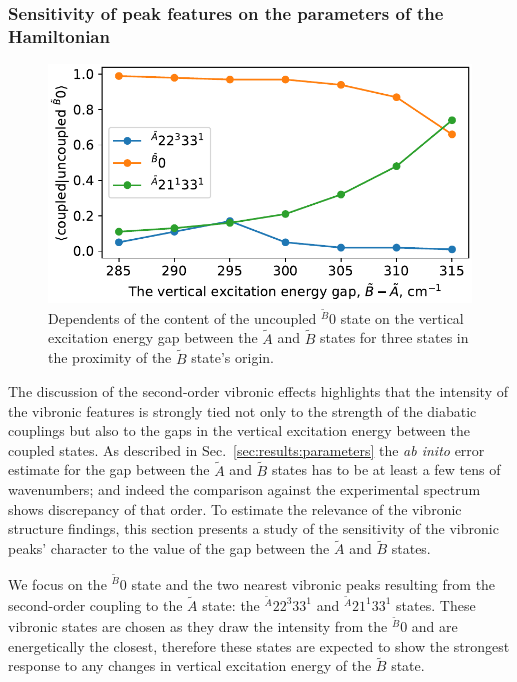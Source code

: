 \documentclass{article}
\begin{document}
\subsubsection{Sensitivity of peak features on the parameters of the
Hamiltonian}
\label{sec:results:simulations:gap}

\begin{figure}
    \begin{center}
        \includegraphics[width=12 cm]{./figures/decomposition.pdf}
    \end{center}
    \caption{
        Dependents of the content of the uncoupled $^{\tilde{B}}0$ state on the
        vertical excitation energy gap between the $\tilde{A}$ and $\tilde{B}$
        states for three states in the proximity of the $\tilde{B}$ state's
        origin.
    }
    \label{fig:decomposition}
\end{figure}

The discussion of the second-order vibronic effects highlights that the
intensity of the vibronic features is strongly tied not only to the strength of
the diabatic couplings but also to the gaps in the vertical excitation energy
between the coupled states. As described in Sec.~\ref{sec:results:parameters}
the \emph{ab inito} error estimate for the gap between the $\tilde{A}$ and
$\tilde{B}$ states has to be at least a few tens of wavenumbers; and indeed the
comparison against the experimental spectrum shows discrepancy of that order.
To estimate the relevance of the vibronic structure findings, this section
presents a study of the sensitivity of the vibronic peaks' character to the
value of the gap between the $\tilde{A}$ and $\tilde{B}$ states.

We focus on the $^{\tilde{B}}0$ state and the two nearest vibronic peaks
resulting from the second-order coupling to the $\tilde{A}$ state: the
$^{\tilde{A}}22^3 33^1$ and $^{\tilde{A}}21^1 33 ^1$ states. These vibronic
states are chosen as they draw the intensity from the $^{\tilde{B}}0$ and are
energetically the closest, therefore these states are expected to show the
strongest response to any changes in vertical excitation energy of the
$\tilde{B}$ state.
\end{document}
